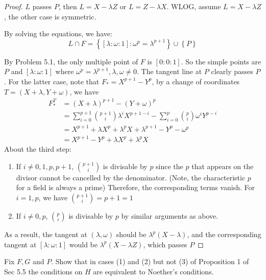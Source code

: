 \documentclass{solution}
\begin{document}
\begin{proof}
    $L$ passes $P$, then $L = X - \lambda Z$ or $L = Z - \lambda X$. WLOG, assume $L = X - \lambda Z$, the other case is symmetric.

    By solving the equations, we have:
    $$L \cap F = \left\lbrace [\lambda:\omega:1]: \omega^p = \lambda^{p + 1} \right\rbrace \cup \left\lbrace P \right\rbrace$$

    By Problem 5.1, the only multiple point of $F$ is $[0:0:1]$. So the simple points are $P$ and $[\lambda:\omega:1]$ where $\omega^p = \lambda^{p + 1}, \lambda, \omega \ne 0$. The tangent line at $P$ clearly passes $P$. For the latter case, note that $F_* = X^{p + 1} - Y^p$, by a change of coordinates $T = (X + \lambda, Y + \omega)$, we have
    $$
        \begin{aligned}
        F_*^T &= (X + \lambda)^{p + 1} - (Y + \omega)^p \\
        &= \sum\limits_{i = 0}^{p + 1} {p + 1 \choose i} \lambda^i X^{p + 1 - i} - \sum\limits_{i = 0}^{p} {p \choose i} \omega^i Y^{p - i} \\
        &= X^{p + 1} + \lambda X^p + \lambda^p X + \lambda^{p + 1} - Y^p - \omega^p \\
        &= X^{p + 1} - Y^p + \lambda X^p + \lambda^p X
        \end{aligned}
    $$
    About the third step:
    \begin{enumerate}
        \item If $i \ne 0, 1, p, p + 1$, ${p + 1 \choose i}$ is divisable by $p$ since the $p$ that appears on the divisor cannot be cancelled by the denominator. (Note, the characteristic $p$ for a field is always a prime) Therefore, the corresponding terms vanish. For $i = 1, p$, we have ${p + 1 \choose i} = p + 1 = 1$
        \item If $i \ne 0, p$, ${p \choose i}$ is divisable by $p$ by similar arguments as above.
    \end{enumerate}
    As a result, the tangent at $(\lambda, \omega)$ should be $\lambda^p(X - \lambda)$, and the corresponding tangent at $[\lambda:\omega:1]$ would be $\lambda^p(X - \lambda Z)$, which passes $P$
\end{proof}

\begin{problem}{5.29}
    Fix $F, G$ and $P$. Show that in cases (1) and (2) but not (3) of Proposition 1 of Sec 5.5 the conditions on $H$ are equivalent to Noether's conditions.
\end{problem}
\end{document}
